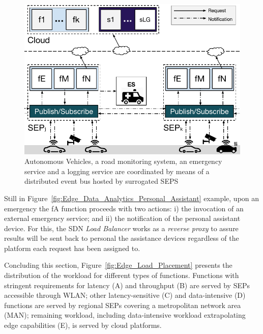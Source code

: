 \begin{figure}[tbp]
	\centering
	\includegraphics[width=1\linewidth]{Figs/Edge_Coordination_AVs_wide.pdf}
	\caption{Autonomous Vehicles, a road monitoring system, an emergency service and a logging service are coordinated by means of a distributed event bus hosted by surrogated SEPS}
	\label{fig:Edge_Coordination_AVs}
\end{figure}


Still in Figure~\ref{fig:Edge_Data_Analytics_Personal_Assistant} example, upon an emergency the fA function proceeds with two actions: i) the invocation of an external emergency service; and ii) the notification of the personal assistant device. For this, the SDN \textit{Load Balancer} works as a \textit{reverse proxy} to assure results will be sent back to personal the assistance devices regardless of the platform each request has been assigned to.

Concluding this section, Figure~\ref{fig:Edge_Load_Placement} presents the distribution of the workload for different types of functions. Functions with stringent requirements for latency (A) and throughput (B) are served by SEPs accessible through WLAN; other latency-sensitive (C) and data-intensive (D) functions are served by regional SEPs covering a metropolitan network area (MAN); remaining workload, including data-intensive workload extrapolating edge capabilities (E), is served by cloud platforms. 



